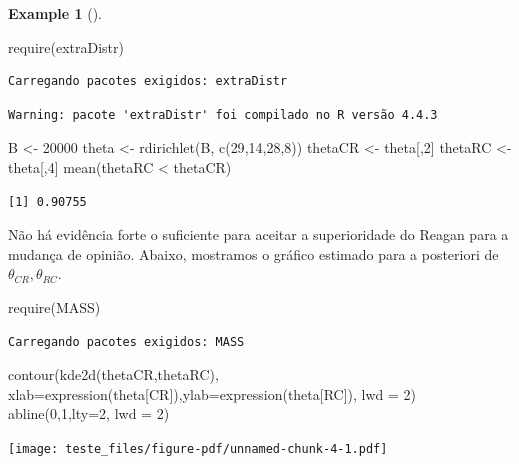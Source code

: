 \documentclass[
  letterpaper,
  DIV=11,
  numbers=noendperiod]{scrreprt}
\newenvironment{Shaded}{\begin{snugshade}}{\end{snugshade}}
\newcommand{\AttributeTok}[1]{\textcolor[rgb]{0.40,0.45,0.13}{#1}}
\newcommand{\DecValTok}[1]{\textcolor[rgb]{0.68,0.00,0.00}{#1}}
\newcommand{\FunctionTok}[1]{\textcolor[rgb]{0.28,0.35,0.67}{#1}}
\newcommand{\NormalTok}[1]{\textcolor[rgb]{0.00,0.23,0.31}{#1}}
\newcommand{\OtherTok}[1]{\textcolor[rgb]{0.00,0.23,0.31}{#1}}
\newcommand{\SpecialCharTok}[1]{\textcolor[rgb]{0.37,0.37,0.37}{#1}}
\theoremstyle{definition}
\newtheorem{example}{Example}[chapter]
\theoremstyle{plain}
\theoremstyle{definition}
\theoremstyle{remark}
\begin{document}
\begin{example}[]
\begin{Shaded}
\begin{Highlighting}[]
\FunctionTok{require}\NormalTok{(extraDistr)}
\end{Highlighting}
\end{Shaded}

\begin{verbatim}
Carregando pacotes exigidos: extraDistr
\end{verbatim}

\begin{verbatim}
Warning: pacote 'extraDistr' foi compilado no R versão 4.4.3
\end{verbatim}

\begin{Shaded}
\begin{Highlighting}[]
\NormalTok{B }\OtherTok{\textless{}{-}} \DecValTok{20000}
\NormalTok{theta }\OtherTok{\textless{}{-}} \FunctionTok{rdirichlet}\NormalTok{(B, }\FunctionTok{c}\NormalTok{(}\DecValTok{29}\NormalTok{,}\DecValTok{14}\NormalTok{,}\DecValTok{28}\NormalTok{,}\DecValTok{8}\NormalTok{))}
\NormalTok{thetaCR }\OtherTok{\textless{}{-}}\NormalTok{ theta[,}\DecValTok{2}\NormalTok{]}
\NormalTok{thetaRC }\OtherTok{\textless{}{-}}\NormalTok{ theta[,}\DecValTok{4}\NormalTok{]}
\FunctionTok{mean}\NormalTok{(thetaRC }\SpecialCharTok{\textless{}}\NormalTok{ thetaCR)}
\end{Highlighting}
\end{Shaded}

\begin{verbatim}
[1] 0.90755
\end{verbatim}

Não há evidência forte o suficiente para aceitar a superioridade do
Reagan para a mudança de opinião. Abaixo, mostramos o gráfico estimado
para a posteriori de \(\theta_{CR},\theta_{RC}\).

\begin{Shaded}
\begin{Highlighting}[]
\FunctionTok{require}\NormalTok{(MASS)}
\end{Highlighting}
\end{Shaded}

\begin{verbatim}
Carregando pacotes exigidos: MASS
\end{verbatim}

\begin{Shaded}
\begin{Highlighting}[]
\FunctionTok{contour}\NormalTok{(}\FunctionTok{kde2d}\NormalTok{(thetaCR,thetaRC), }\AttributeTok{xlab=}\FunctionTok{expression}\NormalTok{(theta[CR]),}\AttributeTok{ylab=}\FunctionTok{expression}\NormalTok{(theta[RC]), }\AttributeTok{lwd =} \DecValTok{2}\NormalTok{)}
\FunctionTok{abline}\NormalTok{(}\DecValTok{0}\NormalTok{,}\DecValTok{1}\NormalTok{,}\AttributeTok{lty=}\DecValTok{2}\NormalTok{, }\AttributeTok{lwd =} \DecValTok{2}\NormalTok{)}
\end{Highlighting}
\end{Shaded}

\texttt{[image: teste\_files/figure-pdf/unnamed-chunk-4-1.pdf]}

\end{example}
\end{document}
